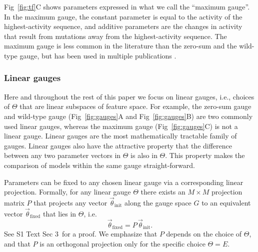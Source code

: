 \documentclass[10pt,letterpaper]{article}
\newcommand{\fig}[2]{Fig\ \ref{#1}#2}
\newcommand{\si}[1]{{S1 Text Sec #1}}
\newcommand{\myfixed}{\textrm{fixed}}
\begin{document}
\fig{fig:tf}C shows parameters expressed in what we call the ``maximum gauge''. In the maximum gauge, the constant parameter is equal to the activity of the highest-activity sequence, and additive parameters are the changes in activity that result from mutations away from the highest-activity sequence. The maximum gauge is less common in the literature than the zero-sum and the wild-type gauge, but has been used in multiple publications \cite{Berg:1987wu, Kinney:2010tn}. 


\subsubsection*{Linear gauges} 

Here and throughout the rest of this paper we focus on linear gauges, i.e., choices of $\Theta$ that are linear subspaces of feature space. For example, the zero-sum gauge and wild-type gauge (\fig{fig:gauges}A and \fig{fig:gauges}B) are two commonly used linear gauges, whereas the maximum gauge (\fig{fig:gauges}C) is not a linear gauge. Linear gauges are the most mathematically tractable family of gauges. Linear gauges also have the attractive property that the difference between any two parameter vectors in $\Theta$ is also in $\Theta$. This property makes the comparison of models within the same gauge straight-forward. 

Parameters can be fixed to any chosen linear gauge via a corresponding linear projection. Formally, for any linear gauge $\Theta$ there exists an  $M \times M$ projection matrix $P$ that projects any vector $\vec{\theta}_\mathrm{init}$ along the gauge space $G$ to an equivalent vector $\vec{\theta}_\myfixed$ that lies in $\Theta$, i.e.
\begin{equation}
    \vec{\theta}_\myfixed = P\, \vec{\theta}_\mathrm{init}.
\end{equation}
See \si{3}\ for a proof. We emphasize that $P$ depends on the choice of $\Theta$, and that $P$ is an orthogonal projection only for the specific choice $\Theta = E$.
\end{document}
